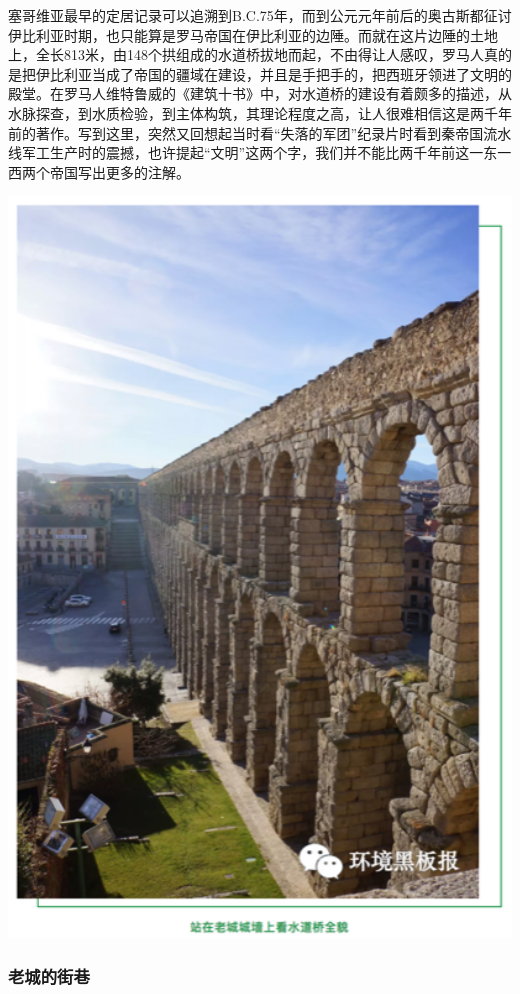 \documentclass[]{book}
\begin{document}
塞哥维亚最早的定居记录可以追溯到B.C.75年，而到公元元年前后的奥古斯都征讨伊比利亚时期，也只能算是罗马帝国在伊比利亚的边陲。而就在这片边陲的土地上，全长813米，由148个拱组成的水道桥拔地而起，不由得让人感叹，罗马人真的是把伊比利亚当成了帝国的疆域在建设，并且是手把手的，把西班牙领进了文明的殿堂。在罗马人维特鲁威的《建筑十书》中，对水道桥的建设有着颇多的描述，从水脉探查，到水质检验，到主体构筑，其理论程度之高，让人很难相信这是两千年前的著作。写到这里，突然又回想起当时看``失落的军团''纪录片时看到秦帝国流水线军工生产时的震撼，也许提起``文明''这两个字，我们并不能比两千年前这一东一西两个帝国写出更多的注解。

\includegraphics[width=5.67in]{images/xt48}

\subsubsection{老城的街巷}
\end{document}

